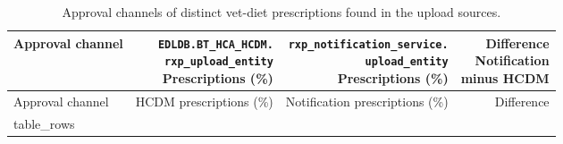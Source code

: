 \begin{longtable}{@{}lrrr@{}}
\caption{Approval channels of distinct vet-diet prescriptions found in the upload sources.}
\label{tab:upload-vet-diet-approval-channels}\\
\toprule
Approval channel & \shortstack{\texttt{EDLDB.BT\_HCA\_HCDM.}\\\texttt{rxp\_upload\_entity}\\Prescriptions (\%)} & \shortstack{\texttt{rxp\_notification\_service.}\\\texttt{upload\_entity}\\Prescriptions (\%)} & \shortstack{Difference\\Notification\\minus HCDM} \\
\midrule
\endfirsthead
\toprule Approval channel & HCDM prescriptions (\%) & Notification prescriptions (\%) & Difference \\
\midrule
\endhead
{{ table_rows }}
\bottomrule
\end{longtable}
